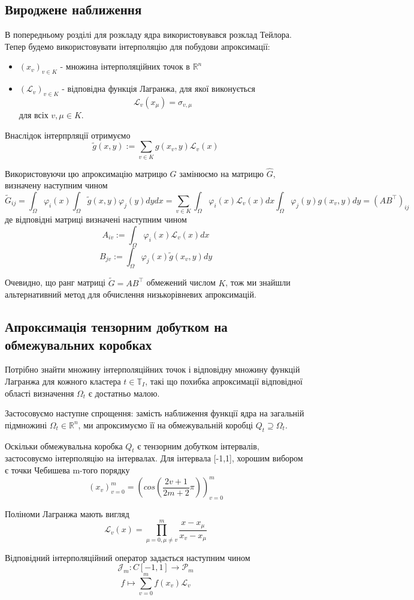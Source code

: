 \documentclass[12pt]{report}
\begin{document}
	\subsection{Вироджене наближення}
	\hspace{0.8cm}В попередньому розділі для розкладу ядра використовувався розклад Тейлора. Тепер будемо використовувати інтерполяцію для побудови апроксимації:
	\begin{itemize}
		\item $(x_v)_{v\in K}$ - множина інтерполяційних точок в $\mathbb{R}^n$
		\item $(\mathcal{L}_v)_{v\in K}$ - відповідна функція Лагранжа, для якої виконується 
		$$\mathcal{L}_v(x_{\mu})=\sigma_{v,\mu}$$
		для всіх $v,\mu\in K$.
	\end{itemize} 
		\par Внаслідок інтерпрляції отримуємо
		$$\tilde{g}(x,y):=\sum_{v\in K}g(x_v,y)\mathcal{L}_v(x)$$
		\par Використовуючи цю апроксимацію матрицю $G$ замінюємо на матрицю $\hat G$, визначену наступним чином
		$$\tilde{G}_{ij}=\int_{\Omega}\varphi_i(x)\int_{\Omega}\tilde{g}(x,y)\varphi_j(y)dy dx=\sum_{v\in K}\int_{\Omega}\varphi_i(x)\mathcal{L}_v(x)dx\int_{\Omega}\varphi_j(y)g(x_v,y)dy=(AB^\top)_{ij}$$
		де відповідні матриці визначені наступним чином
		$$A_{iv}:=\int_{\Omega}\varphi_i(x)\mathcal{L}_v(x)dx$$
		$$B_{jv}:=\int_{\Omega}\varphi_j(x)\tilde{g}(x_v,y)dy$$
		\par Очевидно, що ранг матриці $\tilde{G}=AB^\top$ обмежений числом $K$, тож ми знайшли альтернативний метод для обчислення низькорівневих апроксимацій.
		\subsection{Апроксимація тензорним добутком на обмежувальних коробках}
		\hspace{0.8cm} Потрібно знайти множину інтерполяційних точок і відповідну множину функцій Лагранжа для кожного кластера $t\in\mathbb{T}_I$, такі що похибка апроксимації відповідної області визначення $\Omega_t$ є достатньо малою.
		\par  Застосовуємо наступне спрощення: замість наближення функції ядра на загальній підмножині $\Omega_t\in\mathbb{R}^n$, ми апроксимуємо її на обмежувальній коробці $Q_t\supseteq\Omega_t$.
		\par Оскільки обмежувальна коробка $Q_t$ є тензорним добутком інтервалів, застосовуємо інтерполяцію на інтервалах. Для інтервала [-1,1], хорошим вибором є точки Чебишева m-того порядку
		$$(x_v)_{v=0}^m=\left(cos\left(\frac{2v+1}{2m+2}\pi\right)\right)_{v=0}^m$$
		\par Поліноми Лагранжа мають вигляд
		$$\mathcal{L}_v(x)=\prod_{\mu=0,\mu\not=v}^{m}\frac{x-x_\mu}{x_v-x_\mu}$$
		\par Відповідний інтерполяційний оператор задається наступним чином
		$$\mathcal{J}_m:C[-1,1]\rightarrow\mathcal{P}_m$$
		$$f\mapsto\sum_{v=0}^{m}f(x_v)\mathcal{L}_v$$
		
\end{document}
